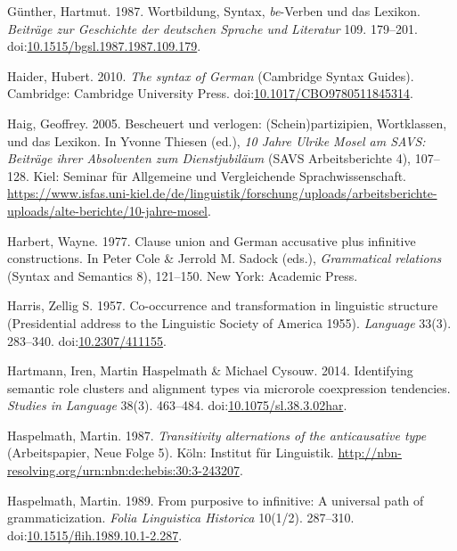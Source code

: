 \leavevmode{}%
Günther, Hartmut. 1987. Wortbildung, {Syntax}, \emph{be}-{Verben} und
das {Lexikon}. \emph{Beiträge zur Geschichte der deutschen Sprache und
Literatur} 109. 179--201.
doi:\href{https://doi.org/10.1515/bgsl.1987.1987.109.179}{10.1515/bgsl.1987.1987.109.179}.

\leavevmode{}%
Haider, Hubert. 2010. \emph{The syntax of {German}} (Cambridge Syntax
Guides). Cambridge: Cambridge University Press.
doi:\href{https://doi.org/10.1017/CBO9780511845314}{10.1017/CBO9780511845314}.

\leavevmode{}%
Haig, Geoffrey. 2005. Bescheuert und verlogen: {(Schein)partizipien},
{Wortklassen}, und das {Lexikon}. In Yvonne Thiesen (ed.), \emph{{10
Jahre Ulrike Mosel am SAVS: Beiträge ihrer Absolventen zum
Dienstjubiläum}} (SAVS Arbeitsberichte 4), 107--128. Kiel: Seminar für
Allgemeine und Vergleichende Sprachwissenschaft.
\url{https://www.isfas.uni-kiel.de/de/linguistik/forschung/uploads/arbeitsberichte-uploads/alte-berichte/10-jahre-mosel}.

\leavevmode{}%
Harbert, Wayne. 1977. Clause union and {German} accusative plus
infinitive constructions. In Peter Cole \& Jerrold M. Sadock (eds.),
\emph{Grammatical relations} (Syntax and Semantics 8), 121--150. New
York: Academic Press.

\leavevmode{}%
Harris, Zellig S. 1957. Co-occurrence and transformation in linguistic
structure ({Presidential} address to the {Linguistic Society of America}
1955). \emph{Language} 33(3). 283--340.
doi:\href{https://doi.org/10.2307/411155}{10.2307/411155}.

\leavevmode{}%
Hartmann, Iren, Martin Haspelmath \& Michael Cysouw. 2014. Identifying
semantic role clusters and alignment types via microrole coexpression
tendencies. \emph{Studies in Language} 38(3). 463--484.
doi:\href{https://doi.org/10.1075/sl.38.3.02har}{10.1075/sl.38.3.02har}.

\leavevmode{}%
Haspelmath, Martin. 1987. \emph{Transitivity alternations of the
anticausative type} (Arbeitspapier, Neue Folge 5). Köln: Institut für
Linguistik. \url{http://nbn-resolving.org/urn:nbn:de:hebis:30:3-243207}.

\leavevmode{}%
Haspelmath, Martin. 1989. From purposive to infinitive: A universal path
of grammaticization. \emph{Folia Linguistica Historica} 10(1/2).
287--310.
doi:\href{https://doi.org/10.1515/flih.1989.10.1-2.287}{10.1515/flih.1989.10.1-2.287}.


